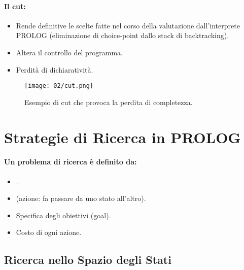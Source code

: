 \paragraph{Il cut:}

\begin{itemize}
  \item Rende definitive le scelte fatte nel corso della valutazione dall'interprete PROLOG (eliminazione di choice-point dallo stack di backtracking). 
  \item Altera il controllo del programma. 
  \item Perdità di dichiaratività.
\end{itemize}

\begin{figure}[h]
    \centering
    \texttt{[image: 02/cut.png]}
    \caption{Esempio di cut che provoca la perdita di completezza.}
\end{figure}

\section{Strategie di Ricerca in PROLOG}

\paragraph{Un problema di ricerca è definito da:} 
    \begin{itemize}
    \item {}. 
    \item {} (azione: fa passare da uno stato all'altro). 
    \item Specifica degli obiettivi (goal).
    \item Costo di ogni azione.
    \end{itemize}




\subsection{Ricerca nello Spazio degli Stati}


















